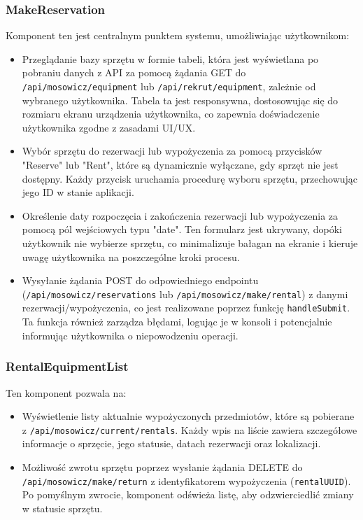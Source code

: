 \documentclass{article}
\begin{document}
\subsubsection{MakeReservation}

Komponent ten jest centralnym punktem systemu, umożliwiając użytkownikom:

\begin{itemize}
    \item Przeglądanie bazy sprzętu w formie tabeli, która jest wyświetlana po pobraniu danych z API za pomocą żądania GET do \texttt{/api/mosowicz/equipment} lub \texttt{/api/rekrut/equipment}, zależnie od wybranego użytkownika. Tabela ta jest responsywna, dostosowując się do rozmiaru ekranu urządzenia użytkownika, co zapewnia doświadczenie użytkownika zgodne z zasadami UI/UX.
    \item Wybór sprzętu do rezerwacji lub wypożyczenia za pomocą przycisków "Reserve" lub "Rent", które są dynamicznie wyłączane, gdy sprzęt nie jest dostępny. Każdy przycisk uruchamia procedurę wyboru sprzętu, przechowując jego ID w stanie aplikacji.
    \item Określenie daty rozpoczęcia i zakończenia rezerwacji lub wypożyczenia za pomocą pól wejściowych typu "date". Ten formularz jest ukrywany, dopóki użytkownik nie wybierze sprzętu, co minimalizuje bałagan na ekranie i kieruje uwagę użytkownika na poszczególne kroki procesu.
    \item Wysyłanie żądania POST do odpowiedniego endpointu (\texttt{/api/mosowicz/reservations} lub \texttt{/api/mosowicz/make/rental}) z danymi rezerwacji/wypożyczenia, co jest realizowane poprzez funkcję \texttt{handleSubmit}. Ta funkcja również zarządza błędami, logując je w konsoli i potencjalnie informując użytkownika o niepowodzeniu operacji.
\end{itemize}

\subsubsection{RentalEquipmentList}

Ten komponent pozwala na:

\begin{itemize}
    \item Wyświetlenie listy aktualnie wypożyczonych przedmiotów, które są pobierane z \texttt{/api/mosowicz/current/rentals}. Każdy wpis na liście zawiera szczegółowe informacje o sprzęcie, jego statusie, datach rezerwacji oraz lokalizacji.
    \item Możliwość zwrotu sprzętu poprzez wysłanie żądania DELETE do \texttt{/api/mosowicz/make/return} z identyfikatorem wypożyczenia (\texttt{rentalUUID}). Po pomyślnym zwrocie, komponent odświeża listę, aby odzwierciedlić zmiany w statusie sprzętu.
\end{itemize}
\end{document}
